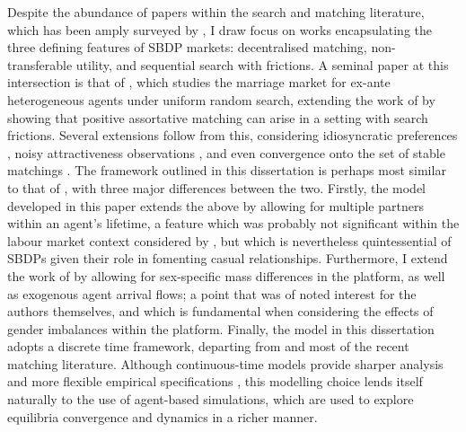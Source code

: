 Despite the abundance of papers within the search and matching literature, which has been amply surveyed by \cite{chade2017sorting}, I draw focus on works encapsulating the three defining features of SBDP markets: decentralised matching, non-transferable utility, and sequential search with frictions. 
A seminal paper at this intersection is that of \cite{burdett1997marriage}, which studies the marriage market for ex-ante heterogeneous agents under uniform random search, extending the work of \cite{becker1973theory} by showing that positive assortative matching can arise in a setting with search frictions.
Several extensions follow from this, considering idiosyncratic preferences \citep{burdett1998two}, noisy attractiveness observations \citep{chade2006matching}, and even convergence onto the set of stable matchings \citep{adachi2003search}. 
The framework outlined in this dissertation is perhaps most similar to that of \cite{burdett1998two}, with three major differences between the two. 
Firstly, the model developed in this paper extends the above by allowing for multiple partners within an agent's lifetime, a feature which was probably not significant within the labour market context considered by \cite{burdett1998two}, but which is nevertheless quintessential of SBDPs given their role in fomenting casual relationships.
Furthermore, I extend the work of \citeauthor{burdett1998two} by allowing for sex-specific mass differences in the platform, as well as exogenous agent arrival flows; a point that was of noted interest for the authors themselves, and which is fundamental when considering the effects of gender imbalances within the platform. 
Finally, the model in this dissertation adopts a discrete time framework, departing from \cite{burdett1998two} and most of the recent matching literature. 
Although continuous-time models provide sharper analysis and more flexible empirical specifications \citep{burdett1999long}, this modelling choice lends itself naturally to the use of agent-based simulations, which are used to explore equilibria convergence and dynamics in a richer manner.

